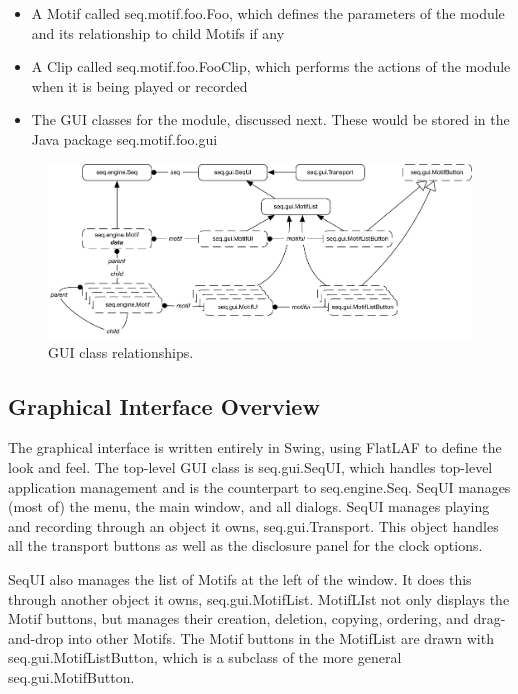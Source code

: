 \documentclass[twoside,10pt]{article}
\begin{document}
\begin{itemize}
\item A Motif called {\sf seq.motif.foo.Foo}, which defines the parameters of the module and its relationship to child Motifs if any
\item A Clip called {\sf seq.motif.foo.FooClip}, which performs the actions of the module when it is being played or recorded
\item The GUI classes for the module, discussed next.  These would be stored in the Java package {\sf seq.motif.foo.gui}
\end{itemize}

\begin{figure}[t]
\centering
\includegraphics[width=5in]{gui}
\caption{GUI class relationships.}
\label{guidev}
\end{figure}


\subsection{Graphical Interface Overview}

The graphical interface is written entirely in Swing, using FlatLAF to define the look and feel.  The top-level GUI class is {\sf seq.gui.SeqUI}, which handles top-level application management and is the counterpart to {\sf seq.engine.Seq}.  SeqUI manages (most of) the menu, the main window, and all dialogs.  SeqUI manages playing and recording through an object it owns, {\sf seq.gui.Transport}.  This object handles all the transport buttons as well as the disclosure panel for the clock options.

SeqUI also manages the list of Motifs at the left of the window.  It does this through another object it owns, {\sf seq.gui.MotifList}.  MotifLIst not only displays the Motif buttons, but manages their creation, deletion, copying, ordering, and drag-and-drop into other Motifs.  The Motif buttons in the MotifList are drawn with {\sf seq.gui.MotifListButton}, which is a subclass of the more general {\sf seq.gui.MotifButton}.
\end{document}
